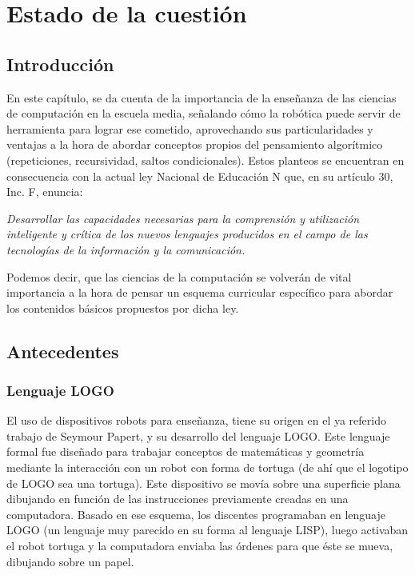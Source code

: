 \chapter{Estado de la cuestión}

\section{Introducción}

En este capítulo, se da cuenta de la importancia de la enseñanza de las ciencias de computación en la escuela media, señalando cómo la robótica puede servir de herramienta para lograr ese cometido, aprovechando sus particularidades y ventajas a la hora de abordar conceptos propios del pensamiento algorítmico (repeticiones, recursividad, saltos condicionales). Estos planteos se encuentran en consecuencia con la actual ley Nacional de Educación N que, en su artículo 30\grad, Inc. F, enuncia: 

\textit{Desarrollar  las  capacidades  necesarias  para  la  comprensión  y  utilización  inteligente  y  crítica  de  los  nuevos  lenguajes  producidos  en  el  campo  de  las tecnologías de la información y la comunicación.}

Podemos decir, que las ciencias de la computación \citep[pág 4]{sadosky2013cc} se volverán de vital importancia a la hora de pensar un esquema curricular específico para abordar los contenidos básicos propuestos por dicha ley.

\section{Antecedentes}

\subsection{Lenguaje LOGO}
El uso de dispositivos robots para enseñanza, tiene su origen en el ya referido trabajo de Seymour Papert, y su desarrollo del lenguaje LOGO. Este lenguaje formal \citep{giro_lenguaje_2015} fue diseñado para trabajar conceptos de matemáticas y geometría mediante la interacción con un robot con forma de tortuga (de ahí que el logotipo de LOGO sea una tortuga). Este dispositivo se movía sobre una superficie plana dibujando en función de las instrucciones previamente creadas en una computadora. Basado en ese esquema, los discentes programaban en lenguaje LOGO (un lenguaje muy parecido en su forma al lenguaje LISP), luego activaban el robot tortuga y la computadora enviaba las órdenes para que éste se mueva, dibujando sobre un papel. 

